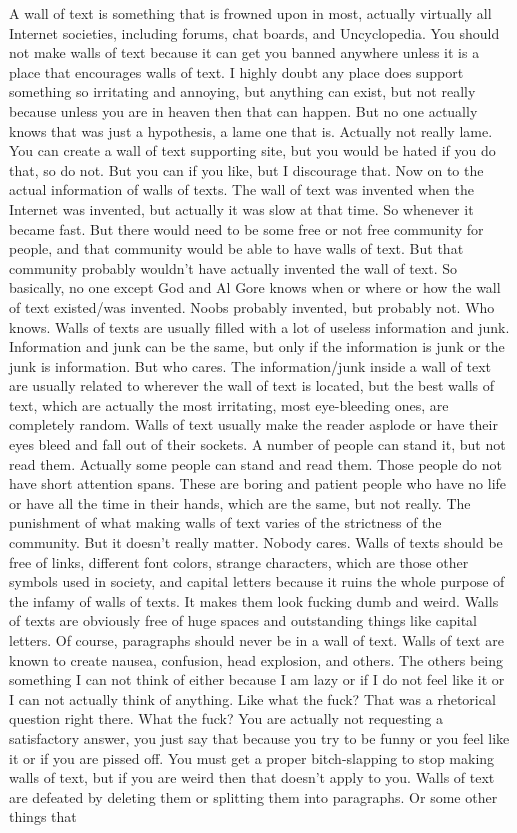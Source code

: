 \documentclass[11pt]{article}
\begin{document}
 \newpage
\begin{center}
A wall of text is something that is frowned upon in most, actually virtually all Internet societies, including forums, chat boards, and Uncyclopedia. You should not make walls of text because it can get you banned anywhere unless it is a place that encourages walls of text. I highly doubt any place does support something so irritating and annoying, but anything can exist, but not really because unless you are in heaven then that can happen. But no one actually knows that was just a hypothesis, a lame one that is. Actually not really lame. You can create a wall of text supporting site, but you would be hated if you do that, so do not. But you can if you like, but I discourage that. Now on to the actual information of walls of texts. The wall of text was invented when the Internet was invented, but actually it was slow at that time. So whenever it became fast. But there would need to be some free or not free community for people, and that community would be able to have walls of text. But that community probably wouldn't have actually invented the wall of text. So basically, no one except God and Al Gore knows when or where or how the wall of text existed/was invented. Noobs probably invented, but probably not. Who knows. Walls of texts are usually filled with a lot of useless information and junk. Information and junk can be the same, but only if the information is junk or the junk is information. But who cares. The information/junk inside a wall of text are usually related to wherever the wall of text is located, but the best walls of text, which are actually the most irritating, most eye-bleeding ones, are completely random. Walls of text usually make the reader asplode or have their eyes bleed and fall out of their sockets. A number of people can stand it, but not read them. Actually some people can stand and read them. Those people do not have short attention spans. These are boring and patient people who have no life or have all the time in their hands, which are the same, but not really. The punishment of what making walls of text varies of the strictness of the community. But it doesn't really matter. Nobody cares. Walls of texts should be free of links, different font colors, strange characters, which are those other symbols used in society, and capital letters because it ruins the whole purpose of the infamy of walls of texts. It makes them look fucking dumb and weird. Walls of texts are obviously free of huge spaces and outstanding things like capital letters. Of course, paragraphs should never be in a wall of text. Walls of text are known to create nausea, confusion, head explosion, and others. The others being something I can not think of either because I am lazy or if I do not feel like it or I can not actually think of anything. Like what the fuck? That was a rhetorical question right there. What the fuck? You are actually not requesting a satisfactory answer, you just say that because you try to be funny or you feel like it or if you are pissed off. You must get a proper bitch-slapping to stop making walls of text, but if you are weird then that doesn't apply to you. Walls of text are defeated by deleting them or splitting them into paragraphs. Or some other things that 
\end{center}
\end{document}
